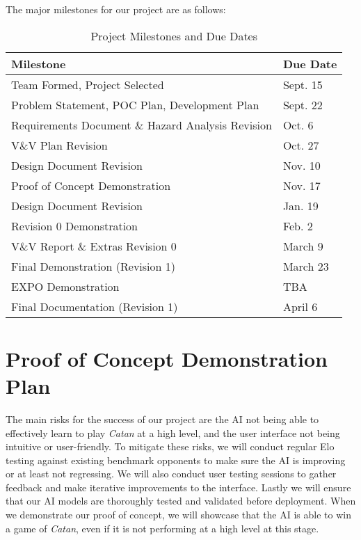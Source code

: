 \documentclass{article}
\begin{document}
\medskip
The major milestones for our project are as follows:
\begin{table}[h!]
  \centering
  \begin{tabular}{|l|l|}
  \hline
  \textbf{Milestone} & \textbf{Due Date} \\ \hline
  Team Formed, Project Selected & Sept. 15 \\ \hline
  Problem Statement, POC Plan, Development Plan & Sept. 22 \\ \hline
  Requirements Document \& Hazard Analysis Revision & Oct. 6 \\ \hline
  V\&V Plan Revision & Oct. 27 \\ \hline
  Design Document Revision & Nov. 10 \\ \hline
  Proof of Concept Demonstration & Nov. 17 \\ \hline
  Design Document Revision & Jan. 19 \\ \hline
  Revision 0 Demonstration & Feb. 2 \\ \hline
  V\&V Report \& Extras Revision 0 & March 9 \\ \hline
  Final Demonstration (Revision 1) & March 23 \\ \hline
  EXPO Demonstration & TBA \\ \hline
  Final Documentation (Revision 1) & April 6 \\ \hline
  
  \end{tabular}
  \caption{Project Milestones and Due Dates}
  \label{tab:project-milestones}
  \end{table}


\section{Proof of Concept Demonstration Plan}

\raggedright
The main risks for the success of our project are the AI not 
being able to effectively learn to play \emph{Catan} at a high level, 
and the user interface not being intuitive or user-friendly. 
To mitigate these risks, we will conduct regular Elo testing
against existing benchmark opponents to make sure the AI is 
improving or at least not regressing. We will also conduct user 
testing sessions to  gather feedback and make iterative improvements to the interface. 
Lastly we will ensure that our AI models are thoroughly tested and 
validated before deployment. When we demonstrate our proof of concept,
we will showcase that the AI is able to win a game of \emph{Catan}, even if
it is not performing at a high level at this stage.
\end{document}
